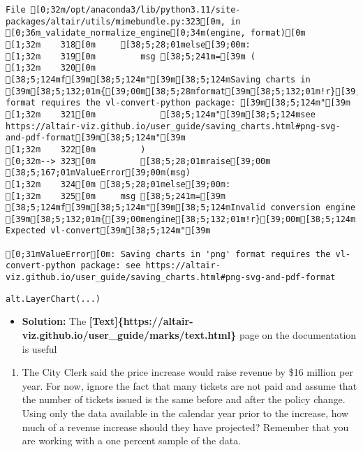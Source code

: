 \documentclass[
  letterpaper,
  DIV=11,
  numbers=noendperiod]{scrartcl}
\providecommand{\tightlist}{%
  \setlength{\itemsep}{0pt}\setlength{\parskip}{0pt}}\usepackage{longtable,booktabs,array}
\begin{document}
\begin{verbatim}
File [0;32m/opt/anaconda3/lib/python3.11/site-packages/altair/utils/mimebundle.py:323[0m, in [0;36m_validate_normalize_engine[0;34m(engine, format)[0m
[1;32m    318[0m     [38;5;28;01melse[39;00m:
[1;32m    319[0m         msg [38;5;241m=[39m (
[1;32m    320[0m             [38;5;124mf[39m[38;5;124m"[39m[38;5;124mSaving charts in [39m[38;5;132;01m{[39;00m[38;5;28mformat[39m[38;5;132;01m!r}[39;00m[38;5;124m format requires the vl-convert-python package: [39m[38;5;124m"[39m
[1;32m    321[0m             [38;5;124m"[39m[38;5;124msee https://altair-viz.github.io/user_guide/saving_charts.html#png-svg-and-pdf-format[39m[38;5;124m"[39m
[1;32m    322[0m         )
[0;32m--> 323[0m         [38;5;28;01mraise[39;00m [38;5;167;01mValueError[39;00m(msg)
[1;32m    324[0m [38;5;28;01melse[39;00m:
[1;32m    325[0m     msg [38;5;241m=[39m [38;5;124mf[39m[38;5;124m"[39m[38;5;124mInvalid conversion engine [39m[38;5;132;01m{[39;00mengine[38;5;132;01m!r}[39;00m[38;5;124m. Expected vl-convert[39m[38;5;124m"[39m

[0;31mValueError[0m: Saving charts in 'png' format requires the vl-convert-python package: see https://altair-viz.github.io/user_guide/saving_charts.html#png-svg-and-pdf-format
\end{verbatim}

\begin{verbatim}
alt.LayerChart(...)
\end{verbatim}

\begin{itemize}
\tightlist
\item
  \textbf{Solution:} The
  \textbf{{[}Text{]}\{https://altair-viz.github.io/user\_guide/marks/text.html\}}
  page on the documentation is useful
\end{itemize}

\begin{enumerate}
\def\labelenumi{\arabic{enumi}.}
\setcounter{enumi}{2}
\tightlist
\item
  The City Clerk said the price increase would raise revenue by \$16
  million per year. For now, ignore the fact that many tickets are not
  paid and assume that the number of tickets issued is the same before
  and after the policy change. Using only the data available in the
  calendar year prior to the increase, how much of a revenue increase
  should they have projected? Remember that you are working with a one
  percent sample of the data.
\end{enumerate}
\end{document}
